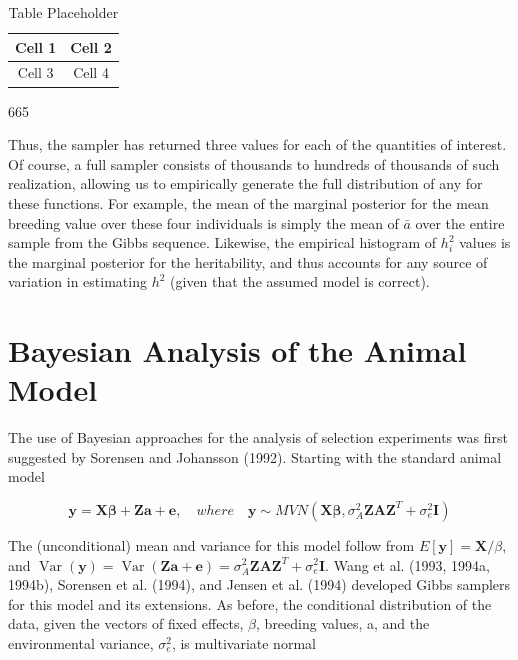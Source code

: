 \documentclass{article}
\begin{document}
\begin{table}[h]
\centering
\begin{tabular}{|c|c|}
\hline
Cell 1 & Cell 2 \\
\hline
Cell 3 & Cell 4 \\
\hline
\end{tabular}
\caption{Table Placeholder}
\end{table}

665

Thus, the sampler has returned three values for each of the quantities of interest. Of course, a full sampler consists of thousands to hundreds of thousands of such realization, allowing us to empirically generate the full distribution of any for these functions. For example, the mean of the marginal posterior for the mean breeding value over these four individuals is simply the mean of  $ \bar{a} $ over the entire sample from the Gibbs sequence. Likewise, the empirical histogram of  $ h_i^2 $ values is the marginal posterior for the heritability, and thus accounts for any source of variation in estimating  $ h^2 $ (given that the assumed model is correct).

\section{Bayesian Analysis of the Animal Model}
The use of Bayesian approaches for the analysis of selection experiments was first suggested by Sorensen and Johansson (1992). Starting with the standard animal model

\begin{equation}
\mathbf{y}=\mathbf{X}\boldsymbol{\beta}+\mathbf{Z}\mathbf{a}+\mathbf{e},\quad where\quad\mathbf{y}\sim MVN(\mathbf{X}\boldsymbol{\beta},\sigma_{A}^{2}\mathbf{Z}\mathbf{A}\mathbf{Z}^{T}+\sigma_{e}^{2}\mathbf{I})
\end{equation}

The (unconditional) mean and variance for this model follow from  $ E[\mathbf{y}] = \mathbf{X} / \beta $, and  $ \operatorname{Var}(\mathbf{y}) = \operatorname{Var}(\mathbf{Z} \mathbf{a} + \mathbf{e}) = \sigma_A^2 \mathbf{Z} \mathbf{A} \mathbf{Z}^T + \sigma_e^2 \mathbf{I} $. Wang et al. (1993, 1994a, 1994b), Sorensen et al. (1994), and Jensen et al. (1994) developed Gibbs samplers for this model and its extensions. As before, the conditional distribution of the data, given the vectors of fixed effects,  $ \beta $, breeding values, a, and the environmental variance,  $ \sigma_e^2 $, is multivariate normal
\end{document}
